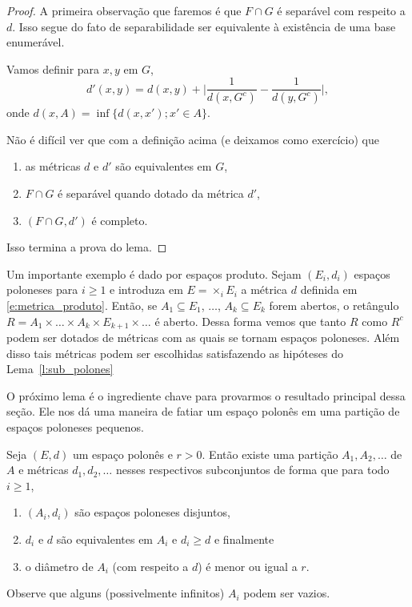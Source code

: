 \begin{proof}
  A primeira observação que faremos é que $F \cap G$ é separável com respeito a $d$.
  Isso segue do fato de separabilidade ser equivalente à existência de uma base enumerável.

  Vamos definir para $x, y$ em $G$,
  \begin{equation}
    d'(x,y) = d(x,y) + \Big| \frac{1}{d(x,G^c)} - \frac{1}{d(y,G^c)} \Big|,
  \end{equation}
  onde $d(x,A) = \inf\{d(x,x'); x' \in A\}$.

  Não é difícil ver que com a definição acima (e deixamos como exercício) que
  \begin{enumerate}[\quad a)]
  \item as métricas $d$ e $d'$ são equivalentes em $G$,
  \item $F \cap G$ é separável quando dotado da métrica $d'$,
  \item $(F \cap G, d')$ é completo.
  \end{enumerate}
  Isso termina a prova do lema.
\end{proof}

\begin{example}
  Um importante exemplo é dado por espaços produto.
  Sejam $(E_i, d_i)$ espaços poloneses para $i \geq 1$ e introduza em $E = \times_i E_i$ a métrica $d$ definida em \eqref{e:metrica_produto}.
  Então, se $A_1 \subseteq E_1$, $\dots$, $A_k \subseteq E_k$ forem abertos, o retângulo $R = A_1 \times \dots \times A_k \times E_{k+1} \times \dots$ é aberto.
  Dessa forma vemos que tanto $R$ como $R^c$ podem ser dotados de métricas com as quais se tornam espaços poloneses.
  Além disso tais métricas podem ser escolhidas satisfazendo as hipóteses do Lema~\ref{l:sub_polones}
\end{example}

O próximo lema é o ingrediente chave para provarmos o resultado principal dessa seção.
Ele nos dá uma maneira de fatiar um espaço polonês em uma partição de espaços poloneses pequenos.

\begin{lemma}
  \label{l:particao_polones}
  Seja $(E, d)$ um espaço polonês e $r > 0$.
  Então existe uma partição $A_1, A_2, \dots$ de $A$ e métricas $d_1, d_2, \dots$ nesses respectivos subconjuntos de forma que para todo $i \geq 1$,
  \begin{enumerate}[\quad a)]
  \item $(A_i, d_i)$ são espaços poloneses disjuntos,
  \item $d_i$ e $d$ são equivalentes em $A_i$ e $d_i \geq d$ e finalmente
  \item o diâmetro de $A_i$ (com respeito a $d$) é menor ou igual a $r$.
  \end{enumerate}
  Observe que alguns (possivelmente infinitos) $A_i$ podem ser vazios.
\end{lemma}

